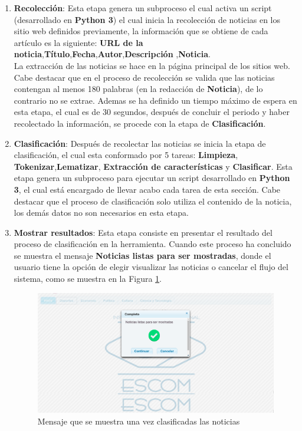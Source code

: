 \begin{enumerate}
  \item \textbf{Recolección}: Esta etapa genera un subproceso el cual activa un script (desarrollado en \textbf{Python 3}) el cual inicia la recolección de noticias en los sitio web definidos previamente, la información que se obtiene de cada artículo es la siguiente: \textbf{URL de la noticia},\textbf{Título},\textbf{Fecha},\textbf{Autor},\textbf{Descripción} ,\textbf{Noticia}.\\

  La extracción de las noticias se hace en la página principal de los sitios web. Cabe destacar que en el proceso de recolección se valida que las noticias contengan al menos 180 palabras (en la redacción de \textbf{Noticia}), de lo contrario no se extrae. Ademas se ha definido un tiempo máximo de espera en esta etapa, el cual es de 30 segundos, después de concluir el periodo y haber recolectado la información, se procede con la etapa de \textbf{Clasificación}.\\

  \item \textbf{Clasificación}: Después de recolectar las noticias se inicia la etapa de clasificación, el cual esta conformado por 5 tareas: \textbf{Limpieza}, \textbf{Tokenizar},\textbf{Lematizar}, \textbf{Extracción de características} y \textbf{Clasificar}. Esta etapa genera un subproceso para ejecutar un script desarrollado en \textbf{Python 3}, el cual está encargado de llevar acabo cada tarea de esta sección. Cabe destacar que el proceso de clasificación solo utiliza el contenido de la noticia, los demás datos no son necesarios en esta etapa.\\

  \item \textbf{Mostrar resultados}: Esta etapa consiste en presentar el resultado del proceso de clasificación en la herramienta. Cuando este proceso ha concluido se muestra el mensaje \textbf{Noticias listas para ser mostradas}, donde el usuario tiene la opción de elegir visualizar las noticias o cancelar el flujo del sistema, como se muestra en la Figura \ref{fig:notClass}.\\

	\begin{figure}[h]
		\centering
		\includegraphics[scale=0.18]{imagenes/Aplicacion/noticiasListasParaSerMostradas.png}
		\caption{Mensaje que se muestra una vez clasificadas las noticias}
		\label{fig:notClass}
	\end{figure}


\end{enumerate}
